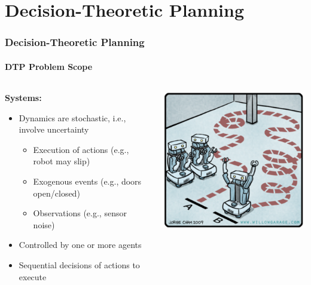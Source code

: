 \section{Decision-Theoretic Planning}

\begin{frame}
\frametitle{Decision-Theoretic Planning}
\framesubtitle{DTP Problem Scope}

\begin{columns}[T]
 	\begin{column}{.7\textwidth}
	\textbf{Systems:}
	\begin{itemize}
		\item Dynamics are stochastic, i.e., involve uncertainty
		\begin{itemize}
			\item Execution of actions (e.g., robot may slip)
			\item Exogenous events (e.g., doors open/closed)
			\item Observations (e.g., sensor noise)
		\end{itemize}
		\item Controlled by one or more agents
		\item Sequential decisions of actions to execute
	\end{itemize}
 	\end{column}
 	\begin{column}{.35\textwidth}
 		\includegraphics[width=1.0\textwidth, right]{figures/path-planning2}
 	\end{column}
\end{columns}

\end{frame}

